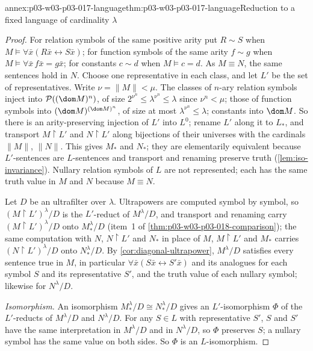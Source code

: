 \begin{annexitem}{annex:p03-w03-p03-017-language}{thm:p03-w03-p03-017-language}{Reduction to a fixed language of cardinality \(\lambda\)}
\begin{proof}
For relation symbols of the same positive arity put \(R\sim S\) when
\(M\models\forall\bar x(R\bar x\leftrightarrow S\bar x)\); for function symbols
of the same arity \(f\sim g\) when \(M\models\forall\bar x\,f\bar x=g\bar x\); for
constants \(c\sim d\) when \(M\models c=d\).  As \(M\equiv N\), the same
sentences hold in \(N\).  Choose one representative in each class, and let
\(L'\) be the set of representatives.  Write \(\nu=\lVert M\rVert<\mu\).  The
classes of \(n\)-ary relation symbols inject into \(\mathcal P((\dom M)^n)\),
of size \(2^{\nu^n}\le\lambda^{\nu^n}\le\lambda\) since \(\nu^n<\mu\); those of
function symbols into \((\dom M)^{(\dom M)^n}\), of size at most
\(\lambda^{\nu^n}\le\lambda\); constants into \(\dom M\).  So there is an
arity-preserving injection of \(L'\) into \(L^0\); rename \(L'\) along it to
\(L_*\), and transport \(M\restriction L'\) and \(N\restriction L'\) along
bijections of their universes with the cardinals \(\lVert M\rVert\),
\(\lVert N\rVert\).  This gives \(M_*\) and \(N_*\); they are elementarily
equivalent because \(L'\)-sentences are \(L\)-sentences and transport and
renaming preserve truth (\cref{lem:iso-invariance}).  Nullary relation
symbols of \(L\) are not represented; each has the same truth value in
\(M\) and \(N\) because \(M\equiv N\).

Let \(D\) be an ultrafilter over \(\lambda\).  Ultrapowers are computed symbol
by symbol, so \((M\restriction L')^\lambda/D\) is the \(L'\)-reduct of
\(M^\lambda/D\), and transport and renaming carry
\((M\restriction L')^\lambda/D\) onto \(M_*^\lambda/D\) (item~1 of
\cref{thm:p03-w03-p03-018-comparison}); the same computation with \(N\),
\(N\restriction L'\) and \(N_*\) in place of \(M\), \(M\restriction L'\) and
\(M_*\) carries \((N\restriction L')^\lambda/D\) onto \(N_*^\lambda/D\).  By
\cref{cor:diagonal-ultrapower}, \(M^\lambda/D\) satisfies every sentence
true in \(M\), in particular \(\forall\bar x(S\bar x\leftrightarrow S'\bar x)\)
and its analogues for each symbol \(S\) and its representative \(S'\), and
the truth value of each nullary symbol; likewise for \(N^\lambda/D\).

\emph{Isomorphism.}  An isomorphism \(M_*^\lambda/D\cong N_*^\lambda/D\) gives
an \(L'\)-isomorphism \(\Phi\) of the \(L'\)-reducts of \(M^\lambda/D\) and
\(N^\lambda/D\).  For any \(S\in L\) with representative \(S'\), \(S\) and
\(S'\) have the same interpretation in \(M^\lambda/D\) and in \(N^\lambda/D\),
so \(\Phi\) preserves \(S\); a nullary symbol has the same value on both
sides.  So \(\Phi\) is an \(L\)-isomorphism.


\end{proof}
\end{annexitem}
